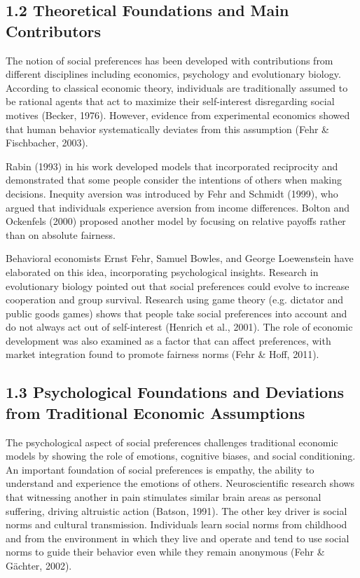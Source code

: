 \documentclass[14pt]{article}
\theoremstyle{remark}
\begin{document}
\subsection{1.2 Theoretical Foundations and Main Contributors}

The notion of social preferences has been developed with contributions from different disciplines including economics, psychology and evolutionary biology. According to classical economic theory, individuals are traditionally assumed to be rational agents that act to maximize their self-interest disregarding social motives (Becker, 1976). However, evidence from experimental economics showed that human behavior systematically deviates from this assumption (Fehr \& Fischbacher, 2003).

Rabin (1993) in his work developed models that incorporated reciprocity and demonstrated that some people consider the intentions of others when making decisions. Inequity aversion was introduced by Fehr and Schmidt (1999), who argued that individuals experience aversion from income differences. Bolton and Ockenfels (2000) proposed another model by focusing on relative payoffs rather than on absolute fairness.

Behavioral economists Ernst Fehr, Samuel Bowles, and George Loewenstein have elaborated on this idea, incorporating psychological insights. Research in evolutionary biology pointed out that social preferences could evolve to increase cooperation and group survival. Research using game theory (e.g. dictator and public goods games) shows that people take social preferences into account and do not always act out of self-interest (Henrich et al., 2001). The role of economic development was also examined as a factor that can affect preferences, with market integration found to promote fairness norms (Fehr \& Hoff, 2011).

\subsection{1.3 Psychological Foundations and Deviations from Traditional Economic Assumptions}

The psychological aspect of social preferences challenges traditional economic models by showing the role of emotions, cognitive biases, and social conditioning. An important foundation of social preferences is empathy, the ability to understand and experience the emotions of others. Neuroscientific research shows that witnessing another in pain stimulates similar brain areas as personal suffering, driving altruistic action (Batson, 1991). The other key driver is social norms and cultural transmission. Individuals learn social norms from childhood and from the environment in which they live and operate and tend to use social norms to guide their behavior even while they remain anonymous (Fehr \& Gächter, 2002).
\end{document}
